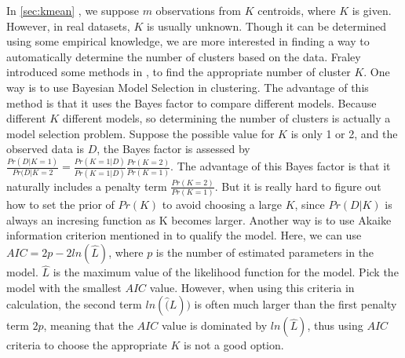 \documentclass[12pt]{article}
\begin{document}
In \ref{sec:kmean} , we suppose $m$ observations from $K$ centroids, where $K$ is given. However, in real datasets, $K$ is usually unknown. Though it can be determined using some empirical knowledge, we are more interested in finding a way to automatically determine the number of clusters based on the data. Fraley introduced some methods in \cite{fraley1998many}, to find the appropriate number of cluster $K$. One way is to use Bayesian Model Selection in clustering. The advantage of this method is that it uses the Bayes factor to compare different models. Because different $K$  different models, so determining the number of clusters is actually a model selection problem. Suppose the possible value for $K$ is only 1 or 2, and the observed data is $D$, the Bayes factor is assessed by $\frac{Pr(D|K=1)}{Pr(D|K=2}=\frac{Pr(K=1|D)}{Pr(K=1|D)}\frac{Pr(K=2)}{Pr(K=1)}$. The advantage of this Bayes factor is that it naturally includes a penalty term $\frac{Pr(K=2)}{Pr(K=1)}$. But it is really hard to figure out how to set the prior of $Pr(K)$ to avoid choosing a large $K$, since $Pr(D|K)$ is always an incresing function as K becomes larger. Another way is to use Akaike information criterion mentioned in \cite{akaike1998information} to qualify the model. Here, we can use $AIC=2p-2ln(\hat{L})$, where $p$ is the number of estimated parameters in the model. $\hat{L}$ is the maximum value of the likelihood function for the model. Pick the model with the smallest $AIC$ value. However, when using this criteria in calculation, the second term $ln(\hat(L))$ is often much larger than the first penalty term $2p$, meaning that the $AIC$ value is dominated by $ln(\hat{L})$, thus using $AIC$ criteria to choose the appropriate $K$ is not a good option.
\end{document}

